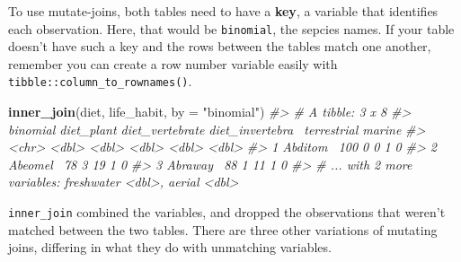\documentclass[]{book}
\newenvironment{Shaded}{}{}
\newcommand{\CommentTok}[1]{\textcolor[rgb]{0.38,0.63,0.69}{\textit{#1}}}
\newcommand{\DataTypeTok}[1]{\textcolor[rgb]{0.56,0.13,0.00}{#1}}
\newcommand{\KeywordTok}[1]{\textcolor[rgb]{0.00,0.44,0.13}{\textbf{#1}}}
\newcommand{\NormalTok}[1]{#1}
\newcommand{\StringTok}[1]{\textcolor[rgb]{0.25,0.44,0.63}{#1}}
\begin{document}
To use mutate-joins, both tables need to have a \textbf{key}, a variable that
identifies each observation. Here, that would be \texttt{binomial}, the sepcies names.
If your table doesn't have such a key and the rows between the tables match
one another, remember you can create a row number variable easily with
\texttt{tibble::column\_to\_rownames()}.

\begin{Shaded}
\begin{Highlighting}[]
\KeywordTok{inner_join}\NormalTok{(diet, life_habit, }\DataTypeTok{by =} \StringTok{"binomial"}\NormalTok{)}
\CommentTok{#> # A tibble: 3 x 8}
\CommentTok{#>   binomial diet_plant diet_vertebrate diet_invertebra~ terrestrial marine}
\CommentTok{#>   <chr>         <dbl>           <dbl>            <dbl>       <dbl>  <dbl>}
\CommentTok{#> 1 Abditom~        100               0                0           1      0}
\CommentTok{#> 2 Abeomel~         78               3               19           1      0}
\CommentTok{#> 3 Abraway~         88               1               11           1      0}
\CommentTok{#> # ... with 2 more variables: freshwater <dbl>, aerial <dbl>}
\end{Highlighting}
\end{Shaded}

\texttt{inner\_join} combined the variables, and dropped the observations that weren't
matched between the two tables. There are three other variations of mutating
joins, differing in what they do with unmatching variables.
\end{document}
